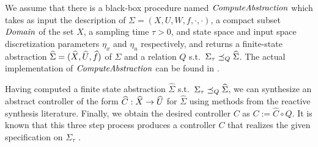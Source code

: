 We assume that there is a black-box procedure named $\mathit{ComputeAbstraction}$ which takes as input the description of $\Sigma = (X,U,W,f,\cdot,\cdot)$, a compact subset $\mathit{Domain}$ of the set $X$, a sampling time $\tau>0$, and state space and input space discretization parameters $\eta_x$ and $\eta_u$ respectively, and returns a finite-state abstraction $\widehat{\Sigma} = (\widehat{X},\widehat{U},\widehat{f})$ of $\Sigma$ and a relation $Q$ s.t.\ $\Sigma_\tau \preceq_{Q} \widehat{\Sigma}$.
The actual implementation of $\mathit{ComputeAbstraction}$ can be found in \cite{reissig2016feedback}.

Having computed a finite state abstraction $\widehat{\Sigma}$ s.t.\ $\Sigma_\tau \preceq_{Q} \widehat{\Sigma}$,
we can synthesize an abstract controller of the form $\widehat{C}:\widehat{X}\rightarrow \widehat{U}$ for $\widehat{\Sigma}$ using methods from the reactive synthesis literature. Finally, we obtain the desired controller $C$ as $C:=\widehat{C}\circ Q$. It is known that this three step process produces a controller $C$ that realizes the given specification on $\Sigma_\tau$ \cite{reissig2016feedback}.
 

